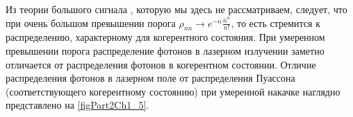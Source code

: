 



Из теории большого сигнала \cite{bScally1974}, которую мы здесь
не рассматриваем, следует, что при очень большом превышении порога 
$\rho_{nn} \rightarrow e^{-\bar{n}}\frac{\bar{n}^n}{n!}$, то есть стремится 
к распределению, характерному для когерентного состояния. При
умеренном превышении порога распределение фотонов в лазерном излучении 
заметно отличается от распределения фотонов в когерентном
состоянии. Отличие распределения фотонов в лазерном поле от
распределения Пуассона (соответствующего когерентному состоянию) при
умеренной накачке наглядно представлено на \autoref{figPart2Ch1_5}.
